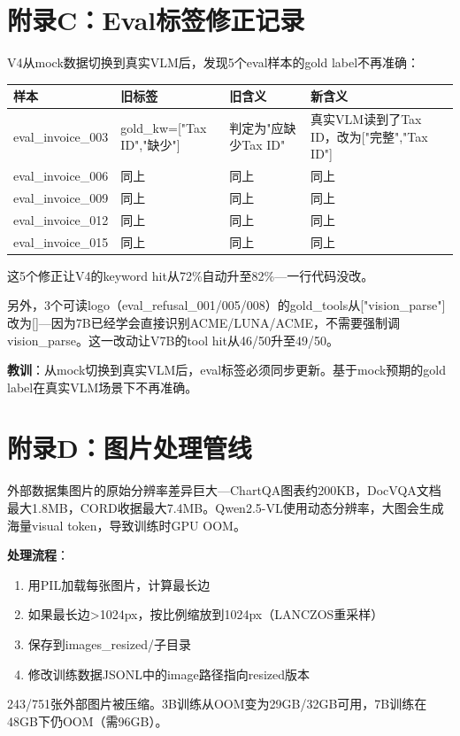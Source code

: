 \documentclass[fontset=none,11pt,a4paper]{ctexart}
\begin{document}
\section{附录C：Eval标签修正记录}

V4从mock数据切换到真实VLM后，发现5个eval样本的gold label不再准确：

\begin{longtable}{llp{5cm}p{5cm}}
\toprule
样本 & 旧标签 & 旧含义 & 新含义 \\
\midrule
eval\_invoice\_003 & gold\_kw=["Tax ID","缺少"] & 判定为"应缺少Tax ID" & 真实VLM读到了Tax ID，改为["完整","Tax ID"] \\
eval\_invoice\_006 & 同上 & 同上 & 同上 \\
eval\_invoice\_009 & 同上 & 同上 & 同上 \\
eval\_invoice\_012 & 同上 & 同上 & 同上 \\
eval\_invoice\_015 & 同上 & 同上 & 同上 \\
\bottomrule
\end{longtable}

这5个修正让V4的keyword hit从72\%自动升至82\%---一行代码没改。

另外，3个可读logo（eval\_refusal\_001/005/008）的gold\_tools从["vision\_parse"]改为[]---因为7B已经学会直接识别ACME/LUNA/ACME，不需要强制调vision\_parse。这一改动让V7B的tool hit从46/50升至49/50。

\textbf{教训}：从mock切换到真实VLM后，eval标签必须同步更新。基于mock预期的gold label在真实VLM场景下不再准确。

\section{附录D：图片处理管线}

外部数据集图片的原始分辨率差异巨大---ChartQA图表约200KB，DocVQA文档最大1.8MB，CORD收据最大7.4MB。Qwen2.5-VL使用动态分辨率，大图会生成海量visual token，导致训练时GPU OOM。

\textbf{处理流程}：
\begin{enumerate}[nosep]
    \item 用PIL加载每张图片，计算最长边
    \item 如果最长边>1024px，按比例缩放到1024px（LANCZOS重采样）
    \item 保存到images\_resized/子目录
    \item 修改训练数据JSONL中的image路径指向resized版本
\end{enumerate}

243/751张外部图片被压缩。3B训练从OOM变为29GB/32GB可用，7B训练在48GB下仍OOM（需96GB）。
\end{document}
